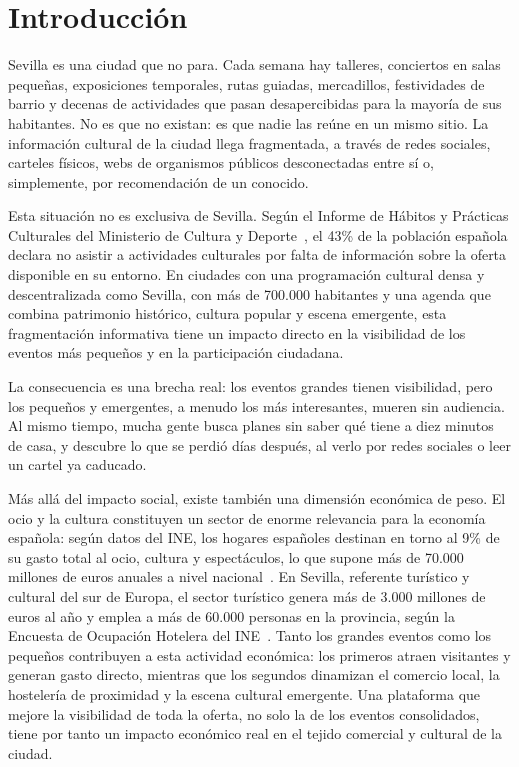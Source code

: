 \chapter{Introducción}\label{cap:introduccion}

Sevilla es una ciudad que no para. Cada semana hay talleres, conciertos en salas pequeñas, exposiciones temporales, rutas guiadas, mercadillos, festividades de barrio y decenas de actividades que pasan desapercibidas para la mayoría de sus habitantes. No es que no existan: es que nadie las reúne en un mismo sitio. La información cultural de la ciudad llega fragmentada, a través de redes sociales, carteles físicos, webs de organismos públicos desconectadas entre sí o, simplemente, por recomendación de un conocido.

Esta situación no es exclusiva de Sevilla. Según el Informe de Hábitos y Prácticas Culturales del Ministerio de Cultura y Deporte~\cite{mcd2023habitos}, el 43\% de la población española declara no asistir a actividades culturales por falta de información sobre la oferta disponible en su entorno. En ciudades con una programación cultural densa y descentralizada como Sevilla, con más de 700.000 habitantes y una agenda que combina patrimonio histórico, cultura popular y escena emergente, esta fragmentación informativa tiene un impacto directo en la visibilidad de los eventos más pequeños y en la participación ciudadana.

La consecuencia es una brecha real: los eventos grandes tienen visibilidad, pero los pequeños y emergentes, a menudo los más interesantes, mueren sin audiencia. Al mismo tiempo, mucha gente busca planes sin saber qué tiene a diez minutos de casa, y descubre lo que se perdió días después, al verlo por redes sociales o leer un cartel ya caducado.

Más allá del impacto social, existe también una dimensión económica de peso. El ocio y la cultura constituyen un sector de enorme relevancia para la economía española: según datos del INE, los hogares españoles destinan en torno al 9\% de su gasto total al ocio, cultura y espectáculos, lo que supone más de 70.000 millones de euros anuales a nivel nacional~\cite{ine2023presupuestos}. En Sevilla, referente turístico y cultural del sur de Europa, el sector turístico genera más de 3.000 millones de euros al año y emplea a más de 60.000 personas en la provincia, según la Encuesta de Ocupación Hotelera del INE~\cite{ine2023eoh}. Tanto los grandes eventos como los pequeños contribuyen a esta actividad económica: los primeros atraen visitantes y generan gasto directo, mientras que los segundos dinamizan el comercio local, la hostelería de proximidad y la escena cultural emergente. Una plataforma que mejore la visibilidad de toda la oferta, no solo la de los eventos consolidados, tiene por tanto un impacto económico real en el tejido comercial y cultural de la ciudad.

